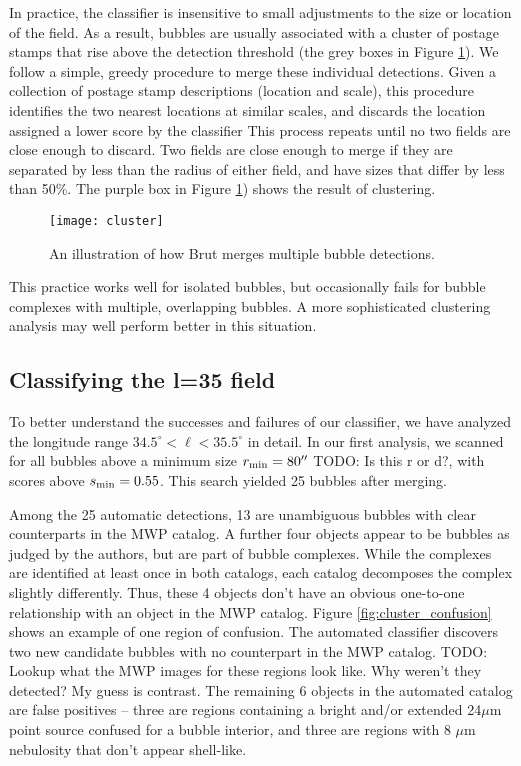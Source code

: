 \documentclass[preprint]{aastex}
\newcommand{\todo}[1]{{\color[rgb]{0, .5, .5} TODO: #1}}
\newcommand{\um}[0]{$\mu$m}
\begin{document}
In practice, the classifier is insensitive to small adjustments to the size or location of the field. As a result, bubbles are usually associated with a cluster of postage stamps that rise above the detection threshold (the grey boxes in Figure \ref{fig:cluster}). We follow a simple, greedy procedure to merge these individual detections. Given a collection of postage stamp descriptions (location and scale), this procedure identifies the two nearest locations at similar scales, and discards the location assigned a lower score by the classifier This process repeats until no two fields are close enough to discard. Two fields are close enough to merge if they are separated by less than the radius of either field, and have sizes that differ by less than 50\%. The purple box in Figure \ref{fig:cluster}) shows the result of clustering.

\begin{figure}
\texttt{[image: cluster]}
\caption{An illustration of how Brut merges multiple bubble detections.}
\label{fig:cluster}
\end{figure}
 
 
This practice works well for isolated bubbles, but occasionally fails for bubble complexes with multiple, overlapping bubbles. A more sophisticated clustering analysis may well perform better in this situation.

\subsection{Classifying the l=35 field}
\label{sec:case_study}
To better understand the successes and failures of our classifier, we have analyzed the longitude range $34.5^\circ < \ell < 35.5^\circ$ in detail. In our first analysis, we scanned for all bubbles above a minimum size $r _{\rm min} = 80''$ \todo{Is this r or d?}, with scores above $s_{\rm min} = 0.55$. This search yielded 25 bubbles after merging. 

Among the 25 automatic detections, 13 are unambiguous bubbles with clear counterparts in the MWP catalog. A further four objects appear to be bubbles as judged by the authors, but are part of bubble complexes. While the complexes are identified at least once in both catalogs, each catalog decomposes the complex slightly differently. Thus, these 4 objects don't have an obvious one-to-one relationship with an object in the MWP catalog. Figure \ref{fig:cluster_confusion} shows an example of one region of confusion. The automated classifier discovers two new candidate bubbles with no counterpart in the MWP catalog. \todo{Lookup what the MWP images for these regions look like. Why weren't they detected? My guess is contrast}. The remaining 6 objects in the automated catalog are false positives -- three are regions containing a bright and/or extended 24\um\, point source confused for a bubble interior, and three are regions with 8 \um\, nebulosity that don't appear shell-like.
\end{document}
